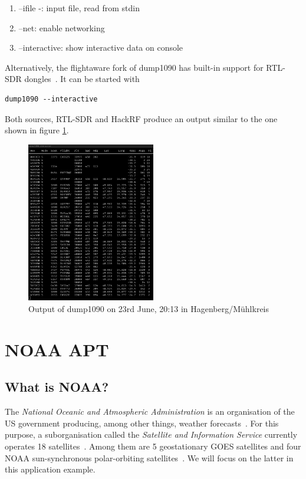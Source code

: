 \documentclass[conference]{IEEEtran}
\begin{document}
\begin{enumerate}
	\item --ifile -: input file, read from stdin
	\item --net: enable networking
	\item --interactive: show interactive data on console
\end{enumerate}
Alternatively, the flightaware fork of dump1090 has built-in support for RTL-SDR dongles~\cite{Github19dump1090-fa}. It can be started with
\begin{lstlisting}
dump1090 --interactive
\end{lstlisting}
Both sources, RTL-SDR and HackRF produce an output similar to the one shown in figure \ref{fig:dump1090screenshot}.
\begin{figure}
	\centering
	\caption{Output of dump1090 on 23rd June, 20:13 in Hagenberg/Mühlkreis} \label{fig:dump1090screenshot}
	\includegraphics[width=0.5\textwidth]{dump1090_screenshot}
\end{figure}

\section{NOAA APT} %
\subsection{What is NOAA?}
The \textit{National Oceanic and Atmospheric Administration} is an organisation of the US government producing, among other things, weather forecasts~\cite{NOAA19agency}. For this purpose, a suborganisation called the \textit{Satellite and Information Service} currently operates 18 satellites~\cite{NOAA19currently}. Among them are 5 geostationary GOES satellites and four NOAA sun-synchronous polar-orbiting satellites~\cite{NOAA19satellites}. We will focus on the latter in this application example.
\end{document}
